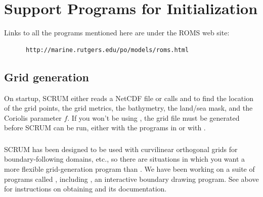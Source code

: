 \section{Support Programs for Initialization}
\label{Progs}

Links to all the programs mentioned here are under the ROMS web site:
\begin{verbatim}
      http://marine.rutgers.edu/po/models/roms.html
\end{verbatim}

\subsection{Grid generation}
\label{Grid}
On startup, SCRUM either reads a NetCDF file or calls 
and 
to find the location of the grid points, the grid metrics,
the bathymetry, the land/sea mask, and the
Coriolis parameter $f$.  If you won't be using , the
grid file must be generated before SCRUM can be run, either with
the programs in  or with .


\subsubsection{}
SCRUM has been designed to be used with curvilinear orthogonal grids
for boundary-following domains, etc., so there are situations in which
you want a more flexible grid-generation program than .
We have been working on a suite of programs called ,
including , an interactive boundary drawing program.
See above for instructions on obtaining 
and its documentation.

